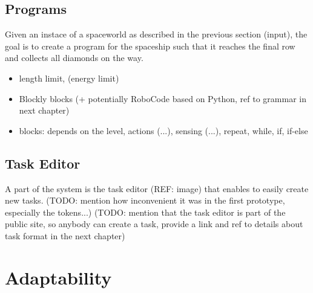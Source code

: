 
\subsection{Programs}
\label{sec:robomission.programs}

Given an instace of a spaceworld as described in the previous section (input),
the goal is to create a program for the spaceship such that
it reaches the final row and collects all diamonds on the way.

\begin{itemize}
\item length limit, (energy limit)
\item Blockly blocks (+ potentially RoboCode based on Python, ref to grammar in next chapter)
\item blocks: depends on the level, actions (...), sensing (...), repeat, while, if, if-else
\end{itemize}





\subsection{Task Editor}
\label{sec:robomission.task-editor}

A part of the system is the task editor (REF: image)
that enables to easily create new tasks.
(TODO: mention how inconvenient it was in the first prototype, especially the tokens...)
(TODO: mention that the task editor is part of the public site, so anybody can create a task, provide a link and ref to details about task format in the next chapter)




\section{Adaptability}
\label{sec:robomission.adaptability}

